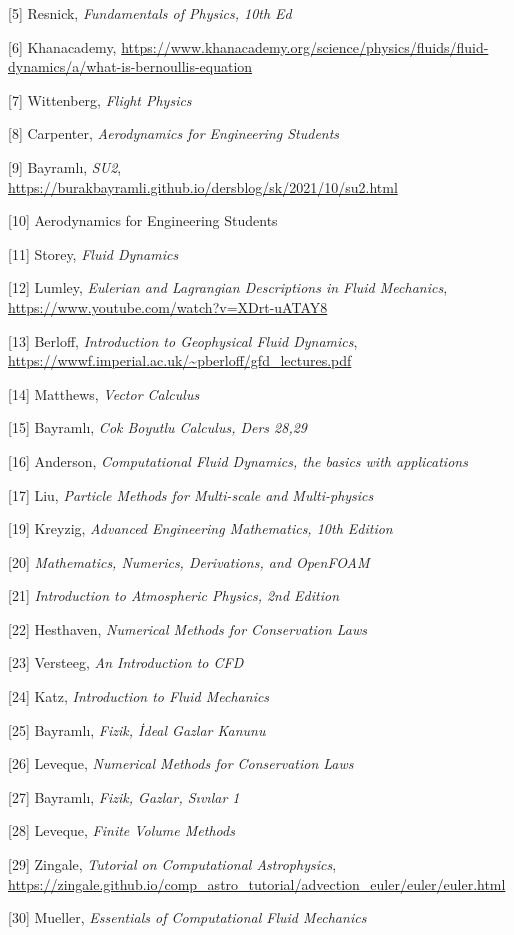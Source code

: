 \documentclass[12pt,fleqn]{article}\usepackage{../../common}
\begin{document}
[5] Resnick, {\em Fundamentals of Physics, 10th Ed}

[6] Khanacademy, 
    \url{https://www.khanacademy.org/science/physics/fluids/fluid-dynamics/a/what-is-bernoullis-equation}

[7] Wittenberg, {\em Flight Physics}

[8] Carpenter, {\em Aerodynamics for Engineering Students}

[9] Bayramlı, {\em SU2},
    \url{https://burakbayramli.github.io/dersblog/sk/2021/10/su2.html}

[10] Aerodynamics for Engineering Students

[11] Storey, {\em Fluid Dynamics}

[12] Lumley, {\em Eulerian and Lagrangian Descriptions in Fluid Mechanics},
    \url{https://www.youtube.com/watch?v=XDrt-uATAY8}

[13] Berloff, {\em Introduction to Geophysical Fluid Dynamics},
    \url{https://wwwf.imperial.ac.uk/~pberloff/gfd_lectures.pdf}

[14] Matthews, {\em Vector Calculus}

[15] Bayramlı, {\em Cok Boyutlu Calculus, Ders 28,29}
    
[16] Anderson, {\em Computational Fluid Dynamics, the basics with applications}

[17] Liu, {\em Particle Methods for Multi-scale and Multi-physics}

[19] Kreyzig, {\em Advanced Engineering Mathematics, 10th Edition}

[20] {\em Mathematics, Numerics, Derivations, and OpenFOAM}

[21] {\em Introduction to Atmospheric Physics, 2nd Edition}

[22] Hesthaven, {\em Numerical Methods for Conservation Laws}

[23] Versteeg, {\em An Introduction to CFD}

[24] Katz, {\em Introduction to Fluid Mechanics}

[25] Bayramlı, {\em Fizik, İdeal Gazlar Kanunu}

[26] Leveque, {\em Numerical Methods for Conservation Laws}

[27] Bayramlı, {\em Fizik, Gazlar, Sıvılar 1}

[28] Leveque, {\em Finite Volume Methods}

[29] Zingale, {\em Tutorial on Computational Astrophysics},
    \url{https://zingale.github.io/comp_astro_tutorial/advection_euler/euler/euler.html}

[30] Mueller, {\em Essentials of Computational Fluid Mechanics}
    
\end{document}
